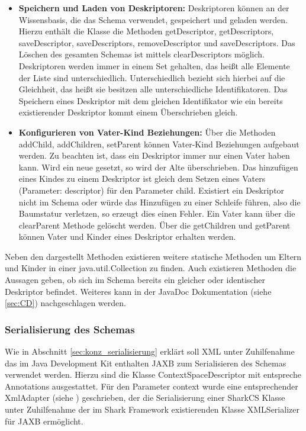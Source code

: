 \documentclass[a4paper]{article}
\begin{document}
	\newpage
	\begin{itemize}
		\item \textbf{Speichern und Laden von Deskriptoren:} Deskriptoren können
		an der Wissensbasis, die das Schema verwendet, gespeichert und
		geladen werden. Hierzu enthält die Klasse die Methoden getDescriptor,
		getDescriptors, saveDescriptor, saveDescriptors, removeDescriptor und
		saveDescriptors. Das Löschen des gesamten Schemas ist mittels 
		clearDescriptors möglich. Deskriptoren werden immer in einem Set gehalten,
		das heißt alle Elemente der Liste sind unterschiedlich. Unterschiedlich
		bezieht sich hierbei auf die Gleichheit, das heißt sie besitzen alle
		unterschiedliche Identifikatoren. Das Speichern eines Deskriptor mit dem
		gleichen Identifikator wie ein bereits existierender Deskriptor
		kommt einem Überschrieben gleich.
		\item \textbf{Konfigurieren von Vater-Kind Beziehungen:} Über die Methoden 
		addChild, addChildren, setParent können Vater-Kind Beziehungen aufgebaut
		werden. Zu beachten ist, dass ein Deskriptor immer nur einen Vater
		haben kann. Wird ein neue gesetzt, so wird der Alte überschrieben. Das
		hinzufügen eines Kindes zu einem Deskriptor ist gleich dem Setzen eines 
		Vaters (Parameter: descriptor) für den Parameter child. Existiert ein
		Deskriptor nicht im Schema oder würde das Hinzufügen zu einer
		Schleife führen, also die Baumstatur verletzen, so erzeugt dies einen
		Fehler.	Ein Vater kann über die clearParent Methode gelöscht werden. Über
		die getChildren	und getParent können Vater und Kinder eines Deskriptor
		erhalten werden.
	\end{itemize}
	
	Neben den dargestellt Methoden existieren weitere statische Methoden um Eltern
	und Kinder in einer java.util.Collection zu finden. Auch existieren Methoden die
	Aussagen geben, ob sich im Schema bereits ein gleicher oder identischer
	Deskriptor befindet. Weiteres kann in der JavaDoc Dokumentation 
	(siehe \autoref{sec:CD}) nachgeschlagen werden.
	
	\subsubsection{Serialisierung des Schemas}
	
	Wie in Abschnitt \ref{sec:konz_serialisierung} erklärt soll XML unter
	Zuhilfenahme das im Java Development Kit enthalten JAXB zum Serialisieren
	des Schemas verwendet werden. Hierzu sind die Klasse ContextSpaceDescriptor
	mit entspreche Annotations ausgestattet. Für den Parameter context wurde
	eine entsprechender XmlAdapter (siehe \cite{XmlAdapter}) geschrieben, der
	die Serialisierung einer SharkCS Klasse unter Zuhilfenahme der im Shark
	Framework existierenden Klasse XMLSerializer für JAXB ermöglicht. \\
	
\end{document}
